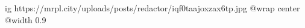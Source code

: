  
 
 
 
 

\ifcmt
  ig https://mrpl.city/uploads/posts/redactor/iqf0taajoxzax6tp.jpg
  @wrap center
  @width 0.9
\fi
